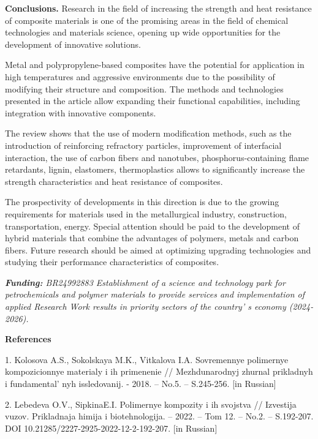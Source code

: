 \begin{multicols}{2}
{\bfseries Conclusions.} Research in the field of increasing the strength
and heat resistance of composite materials is one of the promising areas
in the field of chemical technologies and materials science, opening up
wide opportunities for the development of innovative solutions.

Metal and polypropylene-based composites have the potential for
application in high temperatures and aggressive environments due to the
possibility of modifying their structure and composition. The methods
and technologies presented in the article allow expanding their
functional capabilities, including integration with innovative
components.

The review shows that the use of modern modification methods, such as
the introduction of reinforcing refractory particles, improvement of
interfacial interaction, the use of carbon fibers and nanotubes,
phosphorus-containing flame retardants, lignin, elastomers,
thermoplastics allows to significantly increase the strength
characteristics and heat resistance of composites.

The prospectivity of developments in this direction is due to the
growing requirements for materials used in the metallurgical industry,
construction, transportation, energy. Special attention should be paid
to the development of hybrid materials that combine the advantages of
polymers, metals and carbon fibers. Future research should be aimed at
optimizing upgrading technologies and studying their performance
characteristics of composites.

\emph{{\bfseries Funding:} BR24992883 Establishment of a science and
technology park for petrochemicals and polymer materials to provide
services and implementation of applied Research Work results in priority
sectors of the country' s economy (2024-2026).}
\end{multicols}

\begin{center}
{\bfseries References}
\end{center}

1. Kolosova A.S., Sokolskaya M.K., Vitkalova I.A. Sovremennye polimernye
kompozicionnye materialy i ih primenenie // Mezhdunarodnyj zhurnal
prikladnyh i fundamental' nyh issledovanij. - 2018. --
No.5. -- S.245-256. {[}in Russian{]}

2. Lebedeva O.V., SipkinaE.I. Polimernye kompozity i ih svojstva //
Izvestija vuzov. Prikladnaja himija i biotehnologija. -- 2022. -- Tom
12. -- No.2. -- S.192-207. DOI 10.21285/2227-2925-2022-12-2-192-207.
{[}in Russian{]}

